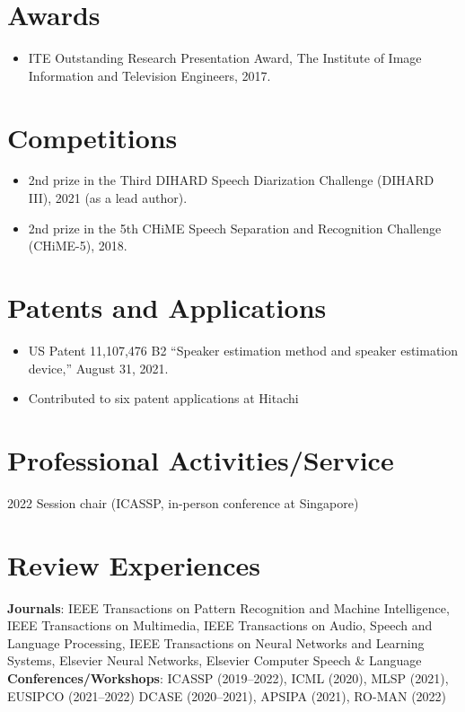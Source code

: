 \documentclass[letterpaper,11pt]{article}
\newcommand{\resumeItem}[1]{
  \item\small{
    {#1 \vspace{-2pt}}
  }
}
\newcommand{\resumeItemListStart}{\begin{itemize}}
\newcommand{\resumeItemListEnd}{\end{itemize}\vspace{-5pt}}
\begin{document}
\section{Awards}
  \resumeItemListStart
    \resumeItem{ITE Outstanding Research Presentation Award, The Institute of Image Information and Television Engineers, 2017.}
  \resumeItemListEnd

\section{Competitions}
  \resumeItemListStart
    \resumeItem{2nd prize in the Third DIHARD Speech Diarization Challenge (DIHARD III), 2021  (as a lead author).}
    \resumeItem{2nd prize in the 5th CHiME Speech Separation and Recognition Challenge (CHiME-5), 2018.}
  \resumeItemListEnd

\section{Patents and Applications}
  \resumeItemListStart
    \resumeItem{US Patent 11,107,476 B2 ``Speaker estimation method and speaker estimation device,'' August 31, 2021.}
    \resumeItem{Contributed to six patent applications at Hitachi}
  \resumeItemListEnd
  
\section{Professional Activities/Service}
2022 Session chair (ICASSP, in-person conference at Singapore)
    
\section{Review Experiences}
 \begin{itemize}[leftmargin=0.15in, label={}]
    \small{\item{
     \textbf{Journals}{: IEEE Transactions on Pattern Recognition and Machine Intelligence, IEEE Transactions on Multimedia, IEEE Transactions on Audio, Speech and Language Processing, IEEE Transactions on Neural Networks and Learning Systems, Elsevier Neural Networks, Elsevier Computer Speech \& Language} \\
     \textbf{Conferences/Workshops}{: ICASSP (2019--2022), ICML (2020), MLSP (2021), EUSIPCO (2021--2022) DCASE (2020--2021), APSIPA (2021), RO-MAN (2022)}
    }}
 \end{itemize}
%
\end{document}
